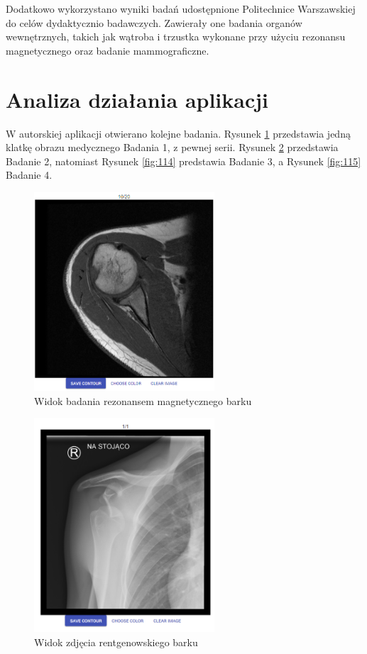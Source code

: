 \documentclass[a4paper,11pt,twoside,openright]{report}
\theoremstyle{definition}
\begin{document}
Dodatkowo wykorzystano wyniki badań udostępnione Politechnice Warszawskiej do
celów dydaktycznio badawczych. Zawierały one badania organów wewnętrznych, takich
jak wątroba i trzustka wykonane przy użyciu rezonansu magnetycznego oraz badanie mammograficzne.

\section {Analiza działania aplikacji}

W autorskiej aplikacji otwierano kolejne badania. Rysunek \ref{fig:112} przedstawia
jedną klatkę obrazu medycznego Badania 1, z pewnej serii. Rysunek \ref{fig:113}
przedstawia Badanie 2, natomiast Rysunek \ref{fig:114} predstawia Badanie 3, a
Rysunek \ref{fig:115} Badanie 4.

\begin{figure}[p]
	\center
	\includegraphics[width=0.6\textwidth]{112}
	\caption{Widok badania rezonansem magnetycznego barku}
    	\label{fig:112}
\end{figure}

\begin{figure}[p]
	\center
	\includegraphics[width=0.6\textwidth]{113}
	\caption{Widok zdjęcia rentgenowskiego barku}
    	\label{fig:113}
\end{figure}
\end{document}
